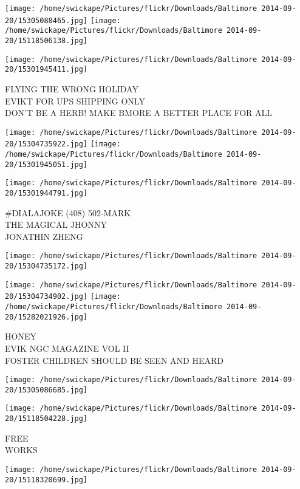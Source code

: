 \documentclass[10pt,letterpaper]{article}
\begin{document}
\texttt{[image: /home/swickape/Pictures/flickr/Downloads/Baltimore 2014-09-20/15305088465.jpg]}
\texttt{[image: /home/swickape/Pictures/flickr/Downloads/Baltimore 2014-09-20/15118506138.jpg]}

\vspace{0.25in}
\texttt{[image: /home/swickape/Pictures/flickr/Downloads/Baltimore 2014-09-20/15301945411.jpg]}

FLYING THE WRONG HOLIDAY\\
EVIKT FOR UPS SHIPPING ONLY\\
DON'T BE A HERB!  MAKE BMORE A BETTER PLACE FOR ALL
\pagebreak

\texttt{[image: /home/swickape/Pictures/flickr/Downloads/Baltimore 2014-09-20/15304735922.jpg]}
\texttt{[image: /home/swickape/Pictures/flickr/Downloads/Baltimore 2014-09-20/15301945051.jpg]}

\vspace{0.25in}
\texttt{[image: /home/swickape/Pictures/flickr/Downloads/Baltimore 2014-09-20/15301944791.jpg]}

\#DIALAJOKE (408) 502{-}MARK\\
THE MAGICAL JHONNY\\
JONATHIN ZHENG
\pagebreak

\texttt{[image: /home/swickape/Pictures/flickr/Downloads/Baltimore 2014-09-20/15304735172.jpg]}

\vspace{0.25in}
\texttt{[image: /home/swickape/Pictures/flickr/Downloads/Baltimore 2014-09-20/15304734902.jpg]}
\texttt{[image: /home/swickape/Pictures/flickr/Downloads/Baltimore 2014-09-20/15282021926.jpg]}

HONEY\\
EVIK NGC MAGAZINE VOL II\\
FOSTER CHILDREN SHOULD BE SEEN AND HEARD
\pagebreak

\texttt{[image: /home/swickape/Pictures/flickr/Downloads/Baltimore 2014-09-20/15305086685.jpg]}

\vspace{0.25in}
\texttt{[image: /home/swickape/Pictures/flickr/Downloads/Baltimore 2014-09-20/15118504228.jpg]}

FREE\\
WORKS
\pagebreak

\texttt{[image: /home/swickape/Pictures/flickr/Downloads/Baltimore 2014-09-20/15118320699.jpg]}
\end{document}
